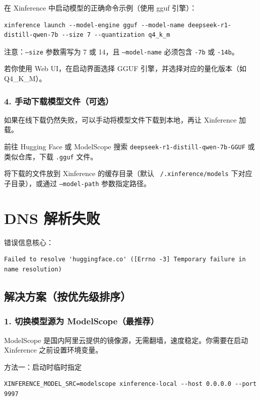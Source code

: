 \documentclass[12pt,UTF8]{ctexbook}
\begin{document}
在 Xinference 中启动模型的正确命令示例（使用 gguf 引擎）：

\begin{lstlisting}
xinference launch --model-engine gguf --model-name deepseek-r1-distill-qwen-7b --size 7 --quantization q4_k_m
\end{lstlisting}

注意：\texttt{--size} 参数需写为 7 或 14，且 \texttt{--model-name} 必须包含 \texttt{-7b} 或 \texttt{-14b}。

若你使用 Web UI，在启动界面选择 GGUF 引擎，并选择对应的量化版本（如 Q4\_K\_M）。

\subsubsection{4. 手动下载模型文件（可选）}

如果在线下载仍然失败，可以手动将模型文件下载到本地，再让 Xinference 加载。

前往 Hugging Face 或 ModelScope 搜索 \texttt{deepseek-r1-distill-qwen-7b-GGUF} 或类似仓库，下载 \texttt{.gguf} 文件。

将下载的文件放到 Xinference 的缓存目录（默认 \texttt{~/.xinference/models} 下对应子目录），或通过 \texttt{--model-path} 参数指定路径。

\section{DNS 解析失败}
\label{sec:dns_failure}

错误信息核心：

\begin{lstlisting}
Failed to resolve 'huggingface.co' ([Errno -3] Temporary failure in name resolution)
\end{lstlisting}

\subsection{解决方案（按优先级排序）}

\subsubsection{1. 切换模型源为 ModelScope（最推荐）}

ModelScope 是国内阿里云提供的镜像源，无需翻墙，速度稳定。你需要在启动 Xinference 之前设置环境变量。

方法一：启动时临时指定

\begin{lstlisting}
XINFERENCE_MODEL_SRC=modelscope xinference-local --host 0.0.0.0 --port 9997
\end{lstlisting}
\end{document}
